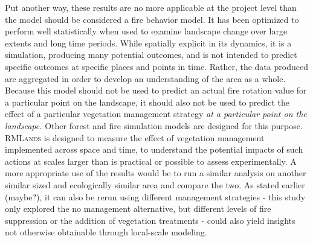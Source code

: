 Put another way, these results are no more applicable at the project level than the model should be considered a fire behavior model. It has been optimized to perform well statistically when used to examine landscape change over large extents and long time periods. While spatially explicit in its dynamics, it is a simulation, producing many potential outcomes, and is not intended to predict specific outcomes at specific places and points in time. Rather, the data produced are aggregated in order to develop an understanding of the area as a whole. Because this model should not be used to predict an actual fire rotation value for a particular point on the landscape, it should also not be used to predict the effect of a particular vegetation management strategy \emph{at a particular point on the landscape.} Other forest and fire simulation models are designed for this purpose. \textsc{RMLands} is designed to measure the effect of vegetation management implemented across space and time, to understand the potential impacts of such actions at scales larger than is practical or possible to assess experimentally. A more appropriate use of the results would be to run a similar analysis on another similar sized and ecologically similar area and compare the two. As stated earlier (maybe?), it can also be rerun using different management strategies - this study only explored the no management alternative, but different levels of fire suppression or the addition of vegetation treatments - could also yield insights not otherwise obtainable through local-scale modeling.













